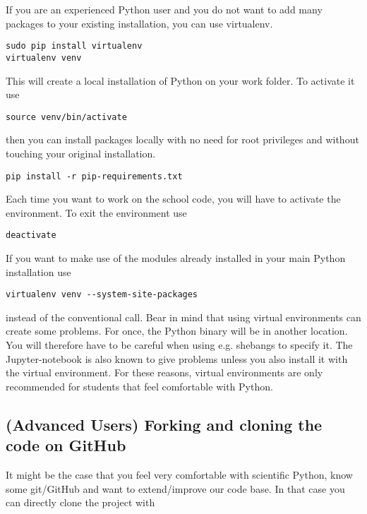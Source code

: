 If you are an experienced Python user and you do not want to add many packages to your existing installation, you can use virtualenv.

\begin{verbatim}
sudo pip install virtualenv
virtualenv venv 
\end{verbatim}

\noindent This will create a local installation of Python on your work folder. To activate it use 

\begin{verbatim}
source venv/bin/activate
\end{verbatim}

\noindent then you can install packages locally with no need for root privileges and without touching your original installation.

\begin{verbatim}
pip install -r pip-requirements.txt
\end{verbatim}

\noindent Each time you want to work on the school code, you will have to activate the environment. To exit the environment use 

\begin{verbatim}
deactivate
\end{verbatim}

\noindent If you want to make use of the modules already installed in your main Python installation use

\begin{verbatim}
virtualenv venv --system-site-packages
\end{verbatim}

instead of the conventional call. Bear in mind that using virtual environments can create some problems. For once, the Python binary will be in another location. You will therefore have to be careful when using e.g. shebangs to specify it. The Jupyter-notebook is also known to give problems unless you also install it with the virtual environment. For these reasons, virtual environments are only recommended for students that feel comfortable with Python. 

\subsection{(Advanced Users) Forking and cloning the code on GitHub}

It might be the case that you feel very comfortable with scientific Python, know some git/GitHub and want to extend/improve our code base. In that case you can directly clone the project with

